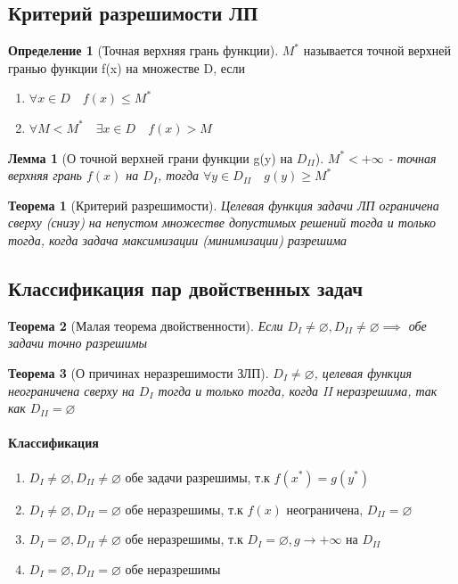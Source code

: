 \documentclass[a4paper]{article}
\newtheorem{theorem}{Теорема}[section]
\newtheorem{lemma}{Лемма}[section]
\theoremstyle{definition}
\newtheorem*{definition}{Определение}
\theoremstyle{remark}
\begin{document}
\subsection{Критерий разрешимости ЛП}
\begin{definition}[Точная верхняя грань функции]
    $M^*$ называется точной верхней гранью функции f(x) на множестве D, если \begin{enumerate}
        \item $\forall x \in D \quad f(x) \leq M^*$
        \item $\forall M < M^* \quad \exists x\in D \quad f(x)> M$
    \end{enumerate}
\end{definition}
\begin{lemma}[О точной верхней грани функции g(y) на $D_{II}$]
    $M^*< +\infty$ - точная верхняя грань $f(x)$ на $D_{I}$, тогда $\forall y \in D_{II} \quad g(y) \geq M^*$
\end{lemma}
\begin{theorem}[Критерий разрешимости]
    Целевая функция задачи ЛП ограничена сверху (снизу) на непустом множестве допустимых решений тогда и только тогда, когда задача максимизации (минимизации) разрешима
\end{theorem}
\subsection{Классификация пар двойственных задач}
\begin{theorem}[Малая теорема двойственности]
    Если $D_I \neq \varnothing, D_{II} \neq \varnothing\implies$ обе задачи точно разрешимы
\end{theorem}
\begin{theorem}[О причинах неразрешимости ЗЛП]
    $D_{I}\neq \varnothing$, целевая функция неограничена сверху на $D_I$ тогда и только тогда, когда II неразрешима, так как $D_{II}=\varnothing$
\end{theorem}
\paragraph*{Классификация}
\begin{enumerate}
    \item $D_I\neq \varnothing, D_{II} \neq \varnothing$ обе задачи разрешимы, т.к $f(x^*) = g(y^*)$
    \item $D_I\neq \varnothing, D_{II} = \varnothing$ обе неразрешимы, т.к $f(x)$ неограничена, $D_{II}=\varnothing$
    \item $D_I = \varnothing, D_{II} \neq \varnothing$ обе неразрешимы, т.к  $D_I = \varnothing, g\to +\infty$ на $D_{II}$
    \item $D_I = \varnothing, D_{II} = \varnothing$ обе неразрешимы
\end{enumerate}
\end{document}
